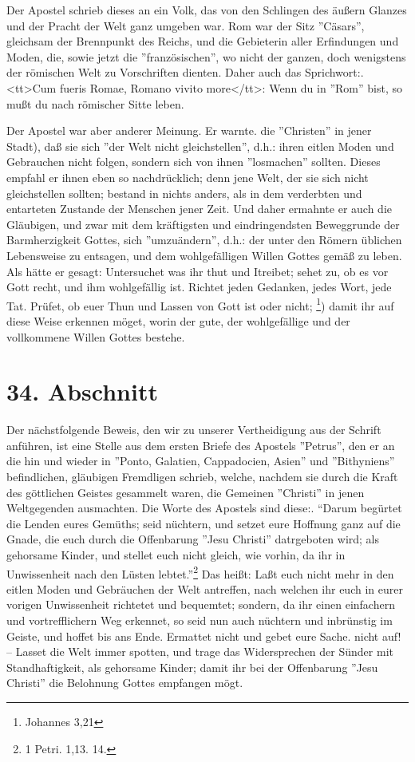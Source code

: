 \medskip

Der Apostel schrieb dieses an ein Volk, das von den Schlingen des äußern Glanzes
und der Pracht der Welt ganz umgeben war. Rom war der Sitz ''Cäsars'', gleichsam
der Brennpunkt des Reichs, und die Gebieterin aller Erfindungen und Moden, die,
sowie jetzt die ''französischen'', wo nicht der ganzen, doch wenigstens der
römischen Welt zu Vorschriften dienten. Daher auch das Sprichwort:. <tt>Cum
fueris Romae, Romano vivito more</tt>: Wenn du in ''Rom'' bist, so mußt du nach
römischer Sitte leben.

\medskip

Der Apostel war aber anderer Meinung. Er warnte. die ''Christen'' in jener
Stadt), daß sie sich ''der Welt nicht gleichstellen'', d.h.: ihren eitlen Moden
und Gebrauchen nicht folgen, sondern sich von ihnen ''losmachen'' sollten.
Dieses empfahl er ihnen eben so nachdrücklich; denn jene Welt, der sie sich
nicht gleichstellen sollten; bestand in nichts anders, als in dem verderbten und
entarteten Zustande der Menschen jener Zeit. Und daher ermahnte er auch die
Gläubigen, und zwar mit dem kräftigsten und eindringendsten Beweggrunde der
Barmherzigkeit Gottes, sich ''umzuändern'', d.h.: der unter den Römern üblichen
Lebensweise zu entsagen, und dem wohlgefälligen Willen Gottes gemäß zu leben.
Als hätte er gesagt: Untersuchet was ihr thut und Itreibet; sehet zu, ob es vor
Gott recht, und ihm wohlgefällig ist. Richtet jeden Gedanken, jedes Wort, jede
Tat. Prüfet, ob euer Thun und Lassen von Gott ist oder nicht; \footnote{Johannes
3,21}) damit ihr auf diese Weise erkennen möget, worin der gute, der
wohlgefällige und der vollkommene Willen Gottes bestehe.

\section{34. Abschnitt} \label{kap9_ab34}

Der nächstfolgende Beweis, den wir zu unserer Vertheidigung aus der Schrift
anführen, ist eine Stelle aus dem ersten Briefe des Apostels ''Petrus'', den er
an die hin und wieder in ''Ponto, Galatien, Cappadocien, Asien'' und
''Bithyniens'' befindlichen, gläubigen Fremdligen schrieb, welche, nachdem sie
durch die Kraft des göttlichen Geistes gesammelt waren, die Gemeinen ''Christi''
in jenen Weltgegenden ausmachten. Die Worte des Apostels sind diese:. "`Darum
begürtet die Lenden eures Gemüths; seid nüchtern, und setzet eure Hoffnung ganz
auf die Gnade, die euch durch die Offenbarung ''Jesu Christi'' datrgeboten wird;
als gehorsame Kinder, und stellet euch nicht gleich, wie vorhin, da ihr in
Unwissenheit nach den Lüsten lebtet."'\footnote{1 Petri. 1,13. 14.} Das heißt:
Laßt euch nicht mehr in den eitlen Moden und Gebräuchen der Welt antreffen, nach
welchen ihr euch in eurer vorigen Unwissenheit richtetet und bequemtet; sondern,
da ihr einen einfachern und vortrefflichern Weg erkennet, so seid nun auch
nüchtern und inbrünstig im Geiste, und hoffet bis ans Ende. Ermattet nicht und
gebet eure Sache. nicht auf! -- Lasset die Welt immer spotten, und trage das
Widersprechen der Sünder mit Standhaftigkeit, als gehorsame Kinder; damit ihr
bei der Offenbarung ''Jesu Christi'' die Belohnung Gottes empfangen mögt.

